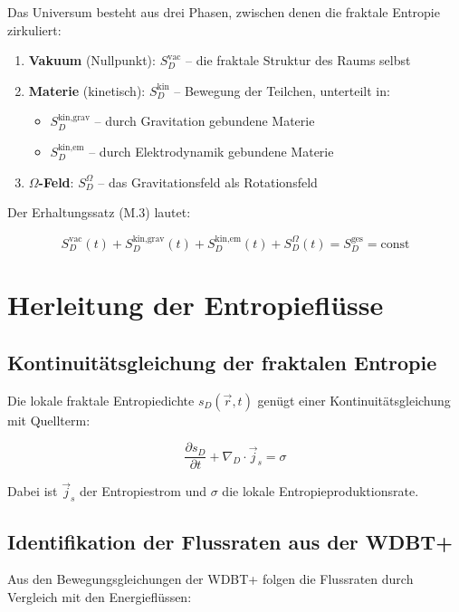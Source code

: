 Das Universum besteht aus drei Phasen, zwischen denen die fraktale Entropie zirkuliert:

\begin{enumerate}
    \item \textbf{Vakuum} (Nullpunkt): $S_D^{\text{vac}}$ – die fraktale Struktur des Raums selbst
    \item \textbf{Materie} (kinetisch): $S_D^{\text{kin}}$ – Bewegung der Teilchen, unterteilt in:
          \begin{itemize}
              \item $S_D^{\text{kin,grav}}$ – durch Gravitation gebundene Materie
              \item $S_D^{\text{kin,em}}$ – durch Elektrodynamik gebundene Materie
          \end{itemize}
    \item \textbf{$\Omega$-Feld}: $S_D^{\Omega}$ – das Gravitationsfeld als Rotationsfeld
\end{enumerate}

Der Erhaltungssatz (M.3) lautet:

\[
S_D^{\text{vac}}(t) + S_D^{\text{kin,grav}}(t) + S_D^{\text{kin,em}}(t) + S_D^{\Omega}(t) = S_D^{\text{ges}} = \text{const} \tag{M.8}
\]

\section{Herleitung der Entropieflüsse}

\subsection{Kontinuitätsgleichung der fraktalen Entropie}

Die lokale fraktale Entropiedichte $s_D(\vec{r}, t)$ genügt einer Kontinuitätsgleichung 
mit Quellterm:

\[
\frac{\partial s_D}{\partial t} + \nabla_D \cdot \vec{j}_s = \sigma \tag{M.9}
\]

Dabei ist $\vec{j}_s$ der Entropiestrom und $\sigma$ die lokale Entropieproduktionsrate.

\subsection{Identifikation der Flussraten aus der WDBT+}

Aus den Bewegungsgleichungen der WDBT+ folgen die Flussraten durch Vergleich mit den 
Energieflüssen:

